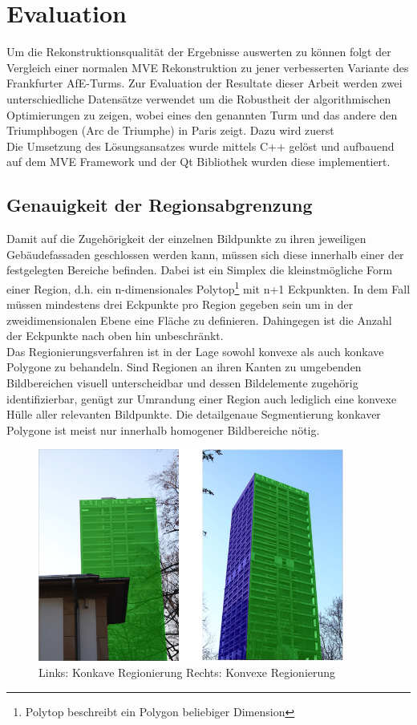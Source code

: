 \chapter{Evaluation}
Um die Rekonstruktionsqualit\"at der Ergebnisse auswerten zu k\"onnen folgt der Vergleich einer normalen MVE Rekonstruktion zu jener verbesserten Variante des Frankfurter AfE-Turms. Zur Evaluation der Resultate dieser Arbeit werden zwei unterschiedliche Datens\"atze verwendet um die Robustheit der algorithmischen Optimierungen zu zeigen, wobei eines den genannten Turm und das andere den Triumphbogen (Arc de Triumphe) in Paris zeigt. Dazu wird zuerst \\
Die Umsetzung des L\"osungsansatzes wurde mittels C++ gel\"ost und aufbauend auf dem MVE Framework und der Qt Bibliothek wurden diese implementiert.

\section{Genauigkeit der Regionsabgrenzung}
Damit auf die Zugeh\"origkeit der einzelnen Bildpunkte zu ihren jeweiligen Geb\"audefassaden geschlossen werden kann, m\"ussen sich diese innerhalb einer der festgelegten Bereiche befinden. Dabei ist ein Simplex die kleinstm\"ogliche Form einer Region, d.h. ein n-dimensionales Polytop\footnote{Polytop beschreibt ein Polygon beliebiger Dimension} mit n+1 Eckpunkten. In dem Fall m\"ussen mindestens drei Eckpunkte pro Region gegeben sein um in der zweidimensionalen Ebene eine Fl\"ache zu definieren. Dahingegen ist die Anzahl der Eckpunkte nach oben hin unbeschr\"ankt. \\
Das Regionierungsverfahren ist in der Lage sowohl konvexe als auch konkave Polygone zu behandeln. Sind Regionen an ihren Kanten zu umgebenden Bildbereichen visuell unterscheidbar und dessen Bildelemente zugeh\"orig identifizierbar, gen\"ugt zur Umrandung einer Region auch lediglich eine konvexe H\"ulle aller relevanten Bildpunkte. Die detailgenaue Segmentierung konkaver Polygone ist meist nur innerhalb homogener Bildbereiche n\"otig. 

\begin{figure}[h]
\centering
\includegraphics[width=0.9\textwidth]{gfx/konvexkonkav.png}
\caption[Links: Konkave Regionierung Rechts: Konvexe Regionierung]{Links: Konkave Regionierung Rechts: Konvexe Regionierung}
\label{gr:konreg}
\end{figure}
\FloatBarrier

